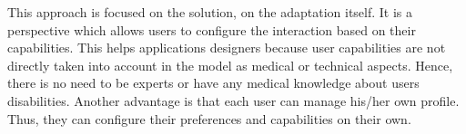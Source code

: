 This approach is focused on the solution, on the adaptation itself. It is a 
perspective which allows users to configure the interaction based on their 
capabilities. This helps applications designers because user capabilities are 
not directly taken into account in the model as medical or technical aspects. 
Hence, there is no need to be experts or have any medical knowledge about 
users disabilities. Another advantage is that each user can manage his/her own 
profile. Thus, they can configure their preferences and capabilities on 
their own. 